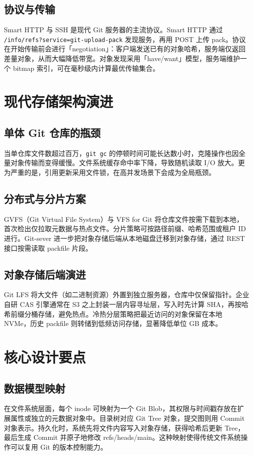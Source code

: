 \section{协议与传输}
Smart HTTP 与 SSH 是现代 Git 服务器的主流协议。Smart HTTP 通过 \texttt{/info/refs?service=git-upload-pack} 发现服务，再用 POST 上传 pack。协议在开始传输前会进行「negotiation」：客户端发送已有的对象哈希，服务端仅返回差量对象，从而大幅降低带宽。对象发现采用「have/want」模型，服务端维护一个 bitmap 索引，可在毫秒级内计算最优传输集合。\par
\chapter{现代存储架构演进}
\section{单体 Git 仓库的瓶颈}
当单仓库文件数超过百万，\texttt{git gc} 的停顿时间可能长达数小时，克隆操作也因全量对象传输而变得缓慢。文件系统缓存命中率下降，导致随机读取 I/O 放大。更为严重的是，引用更新采用文件锁，在高并发场景下会成为全局瓶颈。\par
\section{分布式与分片方案}
GVFS（Git Virtual File System）与 VFS for Git 将仓库文件按需下载到本地，首次检出仅拉取元数据与热点文件。分片策略可按路径前缀、哈希范围或租户 ID 进行。Git-sever 进一步把对象存储后端从本地磁盘迁移到对象存储，通过 REST 接口按需读取 packfile 片段。\par
\section{对象存储后端演进}
Git LFS 将大文件（如二进制资源）外置到独立服务器，仓库中仅保留指针。企业自研 CAS 引擎通常在 S3 之上封装一层内容寻址层，写入时先计算 SHA，再按哈希前缀分桶存储，避免热点。冷热分层策略把最近访问的对象保留在本地 NVMe，历史 packfile 则转储到低频访问存储，显著降低单位 GB 成本。\par
\chapter{核心设计要点}
\section{数据模型映射}
在文件系统层面，每个 inode 可映射为一个 Git Blob，其权限与时间戳存放在扩展属性或独立的元数据对象中。目录树对应 Git Tree 对象，提交图则用 Commit 对象表示。持久化时，系统先将文件内容写入对象存储，获得哈希后更新 Tree，最后生成 Commit 并原子地修改 refs/heads/main。这种映射使得传统文件系统操作可以复用 Git 的版本控制能力。\par
